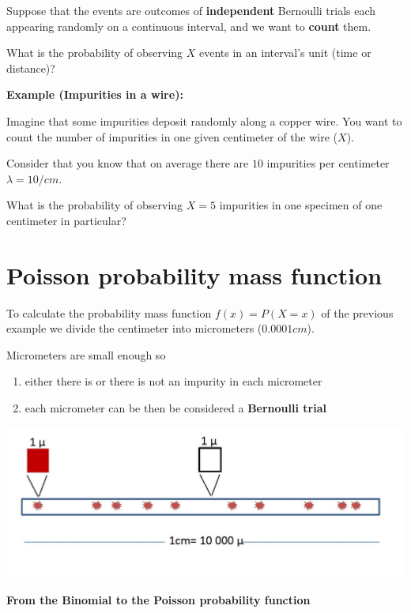 \documentclass[
]{book}
\begin{document}
Suppose that the events are outcomes of \textbf{independent} Bernoulli trials each appearing randomly on a continuous interval, and we want to \textbf{count} them.

What is the probability of observing \(X\) events in an interval's unit (time or distance)?

\textbf{Example (Impurities in a wire):}

Imagine that some impurities deposit randomly along a copper wire. You want to count the number of impurities in one given centimeter of the wire (\(X\)).

Consider that you know that on average there are \(10\) impurities per centimeter \(\lambda=10/cm\).

What is the probability of observing \(X=5\) impurities in one specimen of one centimeter in particular?

\hypertarget{poisson-probability-mass-function}{%
\section{Poisson probability mass function}\label{poisson-probability-mass-function}}

To calculate the probability mass function \(f(x)=P(X=x)\) of the previous example we divide the centimeter into micrometers (\(0.0001cm\)).

Micrometers are small enough so

\begin{enumerate}
\def\labelenumi{\arabic{enumi})}
\item
  either there is or there is not an impurity in each micrometer
\item
  each micrometer can be then be considered a \textbf{Bernoulli trial}
\end{enumerate}

\includegraphics{./figures/Pois.JPG}

\textbf{From the Binomial to the Poisson probability function}
\end{document}
